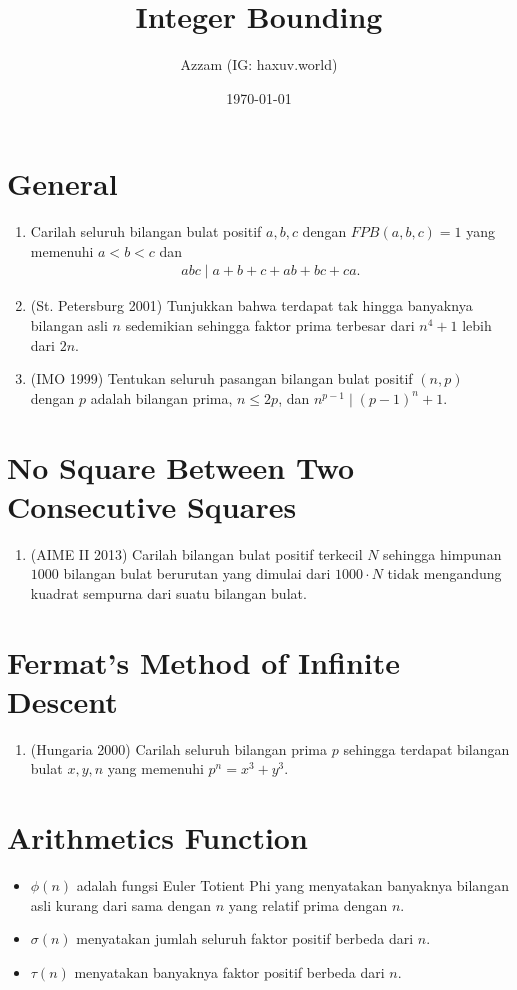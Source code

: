 \documentclass[11pt]{scrartcl}
\title{Integer Bounding}
\author{Azzam (IG: haxuv.world)}
\date{\today}
\begin{document}
\maketitle

\section{General}
\begin{enumerate}
    \item Carilah seluruh bilangan bulat positif $a,b,c$ dengan $FPB(a,b,c)=1$ yang memenuhi $a<b<c$ dan
    \begin{align*}
        abc \mid a+b+c+ab+bc+ca.
    \end{align*}

    \item (St. Petersburg 2001) Tunjukkan bahwa terdapat tak hingga banyaknya bilangan asli $n$ sedemikian sehingga faktor prima terbesar dari $n^4+1$ lebih dari $2n$.

    \item (IMO 1999) Tentukan seluruh pasangan bilangan bulat positif $(n,p)$ dengan $p$ adalah bilangan prima, $n \le 2p$, dan $n^{p-1} \mid (p-1)^n+1$.
\end{enumerate}

\section{No Square Between Two Consecutive Squares}
\begin{enumerate}[resume]
    \item (AIME II 2013) Carilah bilangan bulat positif terkecil $N$ sehingga himpunan $1000$ bilangan bulat berurutan yang dimulai dari $1000\cdot N$ tidak mengandung kuadrat sempurna dari suatu bilangan bulat.
\end{enumerate}

\section{Fermat's Method of Infinite Descent}
\begin{enumerate}[resume]
    \item (Hungaria 2000) Carilah seluruh bilangan prima $p$ sehingga terdapat bilangan bulat $x,y,n$ yang memenuhi $p^n=x^3+y^3$.
\end{enumerate}

\section{Arithmetics Function}
\begin{itemize}
    \item $\phi(n)$ adalah fungsi Euler Totient Phi yang menyatakan banyaknya bilangan asli kurang dari sama dengan $n$ yang relatif prima dengan $n$.
    \item $\sigma(n)$ menyatakan jumlah seluruh faktor positif berbeda dari $n$.
    \item $\tau(n)$ menyatakan banyaknya faktor positif berbeda dari $n$.
\end{itemize}
\end{document}
